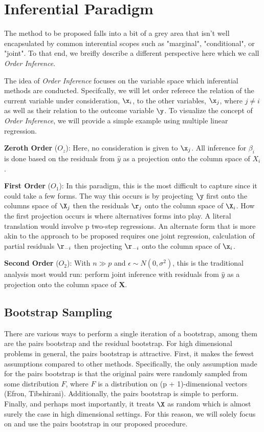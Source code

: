 \section{Inferential Paradigm}

The method to be proposed falls into a bit of a grey area that isn't well encapsulated by common interential scopes such as "marginal", "conditional", or "joint". To that end, we breifly describe a different perspective here which we call \textit{Order Inference}.

The idea of \textit{Order Inference} focuses on the variable space which inferential methods are conducted. Specifcally, we will let order referece the relation of the current variable under consideration, $\x_i$, to the other variables, $\x_j$, where $j \neq i$ as well as their relation to the outcome variable $\y$. To visualize the concept of \textit{Order Inference}, we will provide a simple example using multiple linear regression.

\textbf{Zeroth Order} ($O_z$): Here, no consideration is given to $\x_j$. All inference for $\beta_i$ is done based on the residuals from $\hat{y}$ as a projection onto the column space of $X_i$.

\textbf{First Order} ($O_1$): In this paradigm, this is the most difficult to capture since it could take a few forms. The way this occurs is by projecting $\y$ first onto the columns space of $\X_j$ then the residuals $\r_j$ onto the column space of $\X_i$. How the first projection occurs is where alternatives forms into play. A literal translation would involve p two-step regressions. An alternate form that is more akin to the approach to be proposed requires one joint regression, calculation of partial residuals $\r_{-i}$ then projecting $\r_{-i}$ onto the column space of $\x_i$.

\textbf{Second Order} ($O_2$): With $n \gg p$ and $\epsilon \sim N(0, \sigma^2)$, this is the traditional analysis most would run: perform joint inference with residuals from $\hat{y}$ as a projection onto the column space of $\boldsymbol{X}$.

\subsection{Bootstrap Sampling}

There are various ways to perform a single iteration of a bootstrap, among them are the pairs bootstrap and the residual bootstrap. For high dimensional problems in general, the pairs bootstrap is attractive. First, it makes the fewest assumptions compared to other methods. Specifically, the only assumption made for the pairs bootstrap is that the original pairs were randomly sampled from some distribution $F$, where $F$ is a distribution on (p + 1)-dimensional vectors (Efron, Tibshirani). Additionally, the pairs bootstrap is simple to perform. Finally, and perhaps most importantly, it treats $\X$ as random which is almost surely the case in high dimensional settings. For this reason, we will solely focus on and use the pairs bootstrap in our proposed procedure.
